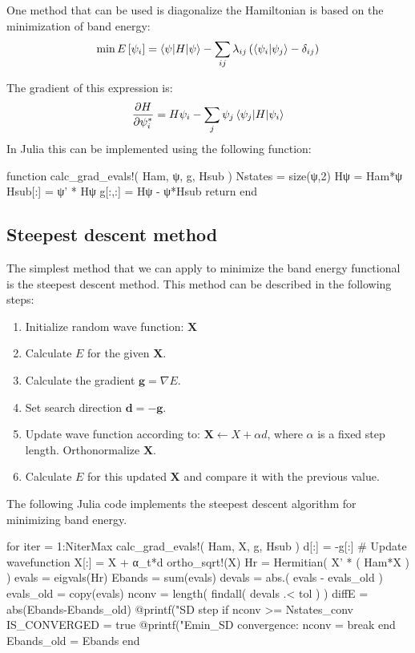 One method that can be used is diagonalize the Hamiltonian is based on the minimization
of band energy:
\begin{equation}
\min E\left[{\psi_{i}}\right] = \braket{\psi | H | \psi} - \sum_{ij}\lambda_{ij}\left(
\braket{ \psi_{i} | \psi_{j} } - \delta_{ij}
\right)
\end{equation}

The gradient of this expression is:
\begin{equation}
\frac{\partial H}{\partial \psi^{*}_{i}} = H\psi_{i} -
\sum_{j} \psi_{j} \braket{\psi_{j} | H | \psi_{i}}
\end{equation}
%
In Julia this can be implemented using the following function:
%
\begin{juliacode}
function calc_grad_evals!( Ham, ψ, g, Hsub )
  Nstates = size(ψ,2)
  Hψ = Ham*ψ
  Hsub[:] = ψ' * Hψ
  g[:,:] = Hψ - ψ*Hsub
  return
end
\end{juliacode}

\subsection{Steepest descent method}

The simplest method that we can apply to minimize the band energy functional is
the steepest descent method. This method can be described in the following steps:
\begin{enumerate}
\item Initialize random wave function: $\mathbf{X}$
\item Calculate $E$ for the given $\mathbf{X}$.
\item Calculate the gradient $\mathbf{g} = \nabla E$.
\item Set search direction $\mathbf{d} = -\mathbf{g}$.
\item Update wave function according to: $\mathbf{X} \leftarrow X + \alpha d$, where $\alpha$ is
a fixed step length. Orthonormalize $\mathbf{X}$.
\item Calculate $E$ for this updated $\mathbf{X}$ and compare it with the previous value.
\end{enumerate}

The following Julia code implements the steepest descent algorithm for minimizing band energy.
\begin{juliacode}
for iter = 1:NiterMax
  calc_grad_evals!( Ham, X, g, Hsub )
  d[:] = -g[:]
  # Update wavefunction
  X[:] = X + α_t*d
  ortho_sqrt!(X)
  Hr = Hermitian( X' * ( Ham*X ) )
  evals = eigvals(Hr)
  Ebands = sum(evals)
  devals = abs.( evals - evals_old )
  evals_old = copy(evals)
  nconv = length( findall( devals .< tol ) )
  diffE = abs(Ebands-Ebands_old)
  @printf("SD step %
  if nconv >= Nstates_conv
      IS_CONVERGED = true
      @printf("Emin_SD convergence: nconv = %
      break
  end
  Ebands_old = Ebands
end
\end{juliacode}

